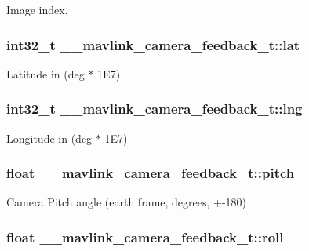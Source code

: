Image index. 

\hypertarget{struct____mavlink__camera__feedback__t_ac1d1bdd5f5868592438f106a8c211ea9}{
\subsubsection[{lat}]{\setlength{\rightskip}{0pt plus 5cm}int32\+\_\+t \+\_\+\+\_\+mavlink\+\_\+camera\+\_\+feedback\+\_\+t\+::lat}}\label{struct____mavlink__camera__feedback__t_ac1d1bdd5f5868592438f106a8c211ea9}


Latitude in (deg $\ast$ 1\+E7) 

\hypertarget{struct____mavlink__camera__feedback__t_afd7fea53403882b1ba5f3610852ec1bf}{
\subsubsection[{lng}]{\setlength{\rightskip}{0pt plus 5cm}int32\+\_\+t \+\_\+\+\_\+mavlink\+\_\+camera\+\_\+feedback\+\_\+t\+::lng}}\label{struct____mavlink__camera__feedback__t_afd7fea53403882b1ba5f3610852ec1bf}


Longitude in (deg $\ast$ 1\+E7) 

\hypertarget{struct____mavlink__camera__feedback__t_a026bd6f65ad9a56b5fcc0518f9b58a18}{
\subsubsection[{pitch}]{\setlength{\rightskip}{0pt plus 5cm}float \+\_\+\+\_\+mavlink\+\_\+camera\+\_\+feedback\+\_\+t\+::pitch}}\label{struct____mavlink__camera__feedback__t_a026bd6f65ad9a56b5fcc0518f9b58a18}


Camera Pitch angle (earth frame, degrees, +-\/180) 

\hypertarget{struct____mavlink__camera__feedback__t_a72bb9c942427644c1b8184316057c8ed}{
\subsubsection[{roll}]{\setlength{\rightskip}{0pt plus 5cm}float \+\_\+\+\_\+mavlink\+\_\+camera\+\_\+feedback\+\_\+t\+::roll}}\label{struct____mavlink__camera__feedback__t_a72bb9c942427644c1b8184316057c8ed}


